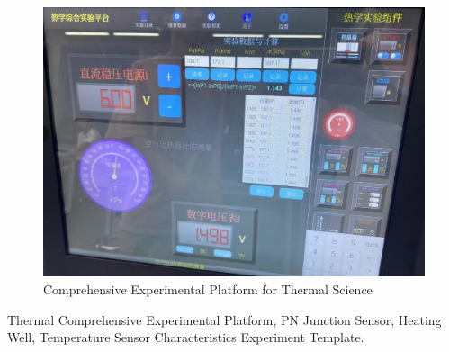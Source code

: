\documentclass[UTF8]{article}
\begin{document}
    		\begin{figure}[H]
    	\centering
    	\includegraphics[clip,scale=0.4,trim={0 0 0 0}]{fig/fig2.png}
        \caption{Comprehensive Experimental Platform for Thermal Science}
        \label{figure.2}
            \end{figure} 
            
     Thermal Comprehensive Experimental Platform, PN Junction Sensor, Heating Well, Temperature Sensor Characteristics Experiment Template.
     
\end{document}
